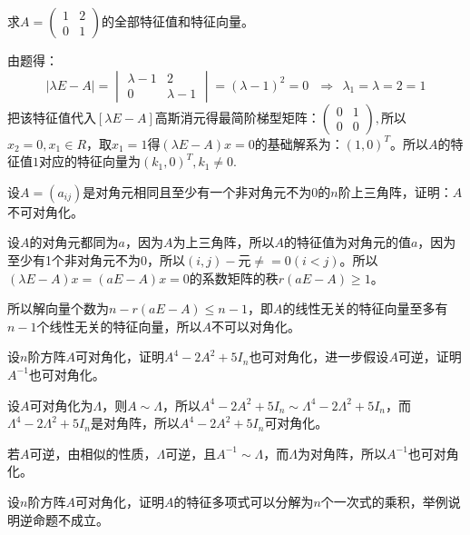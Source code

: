 \documentclass[a4paper]{report}
\begin{document}
\EX 求$A=
\begin{pmatrix}
1&2\\0&1
\end{pmatrix}
$的全部特征值和特征向量。

\begin{jie}
由题得：
\begin{equation*}
|\lambda E-A|=
\begin{vmatrix}
\lambda-1&2\\
0&\lambda-1
\end{vmatrix}=(\lambda-1)^2=0~~~\Rightarrow~~\lambda_1=\lambda=2=1
\end{equation*}
把该特征值代入$[\lambda E-A]$高斯消元得最简阶梯型矩阵：$
\begin{pmatrix}
0&1\\0&0
\end{pmatrix},
$所以$x_2=0,x_1\in R$，取$x_1=1$得$(\lambda E-A)x=0$的基础解系为：$(1,0)^T$。所以$A$的特征值$1$对应的特征向量为$(k_1,0)^T,k_1\neq 0$.
\end{jie}


\EX 设$A=(a_{ij})$是对角元相同且至少有一个非对角元不为0的$n$阶上三角阵，证明：$A$不可对角化。

\begin{zhengming}
设$A$的对角元都同为$a$，因为$A$为上三角阵，所以$A$的特征值为对角元的值$a$，因为至少有1个非对角元不为0，所以$(i,j)-$元$\neq=0(i<j)$。所以$(\lambda E-A)x=(aE-A)x=0$的系数矩阵的秩$r(aE-A)\geq 1$。

所以解向量个数为$n-r(aE-A)\leq n-1$，即$A$的线性无关的特征向量至多有$n-1$个线性无关的特征向量，所以$A$不可以对角化。
\end{zhengming}

\EX 设$n$阶方阵$A$可对角化，证明$A^4-2A^2+5I_{n}$也可对角化，进一步假设$A$可逆，证明$A^{-1}$也可对角化。

\begin{zhengming}
设$A$可对角化为$\Lambda$，则$A\sim \Lambda$，所以$A^4-2A^2+5I_n\sim \Lambda^4-2\Lambda^2+5I_n$，而$\Lambda^4-2\Lambda^2+5I_n$是对角阵，所以$A^4-2A^2+5I_{n}$可对角化。

若$A$可逆，由相似的性质，$\Lambda$可逆，且$A^{-1}\sim \Lambda$，而$\Lambda$为对角阵，所以$A^{-1}$也可对角化。
\end{zhengming}

\EX 设$n$阶方阵$A$可对角化，证明$A$的特征多项式可以分解为$n$个一次式的乘积，举例说明逆命题不成立。
\end{document}
